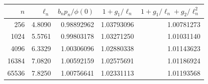 \begin{tabular}{rrrrr}
\toprule
$n$ & $\ell_n$ & $b_n p_n/\phi(0)$ & $1+g_1/\ell_n$ & $1+g_1/\ell_n+g_2/\ell_n^2$ \\
\midrule
256 & 4.8090 & 0.98892962 & 1.03793096 & 1.00781273 \\
1024 & 5.5761 & 0.99803178 & 1.03271250 & 1.01031140 \\
4096 & 6.3329 & 1.00306096 & 1.02880338 & 1.01143623 \\
16384 & 7.0820 & 1.00592159 & 1.02575691 & 1.01186924 \\
65536 & 7.8250 & 1.00756641 & 1.02331113 & 1.01193568 \\
\bottomrule
\end{tabular}
